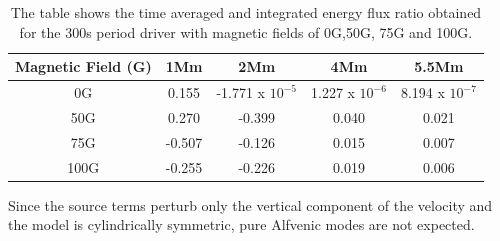 \documentclass[linenumbers]{aastex63}
\begin{document}
\begin{table}\label{energyflux}
\centering
\begin{tabular}{c c c c c}
\hline
Magnetic Field (G)   &  1Mm  &  2Mm &  4Mm & 5.5Mm \\
\hline
0G & 0.155  &    -1.771 x $10^{-5}$      &   1.227 x $10^{-6}$     &   8.194 x $10^{-7}$      \\
\hline
50G & 0.270  &   -0.399       &   0.040      &  0.021     \\
\hline
75G & -0.507  &    -0.126      &   0.015     &   0.007      \\
\hline
100G & -0.255  &   -0.226      &   0.019      &   0.006    \\
\hline

\end{tabular} 
\caption{The table shows the time averaged and integrated energy flux ratio obtained  for the 300s period driver with magnetic fields of 0G,50G, 75G and 100G.}
\label{energyfluxratio}
\end{table}


  Since the source terms perturb only the vertical component of the velocity and the model is cylindrically symmetric, pure Alfvenic modes are not expected. 






\end{document}
